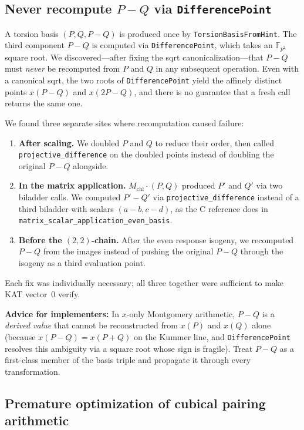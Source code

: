 \subsection{Never recompute \texorpdfstring{$P{-}Q$}{P-Q} via
  \texttt{DifferencePoint}}
\label{sec:bug-pmq-recompute}

A torsion basis $(P, Q, P{-}Q)$ is produced once by
\texttt{TorsionBasisFromHint}.  The third component $P{-}Q$ is
computed via \texttt{DifferencePoint}, which takes an
$\mathbb{F}_{p^2}$ square root.  We discovered---after fixing the
sqrt canonicalization---that $P{-}Q$ must \emph{never} be recomputed
from $P$ and $Q$ in any subsequent operation.  Even with a canonical
sqrt, the two roots of \texttt{DifferencePoint} yield the affinely
distinct points $x(P{-}Q)$ and $x(2P{-}Q)$, and there is no guarantee
that a fresh call returns the same one.

We found three separate sites where recomputation caused failure:
\begin{enumerate}
  \item \textbf{After scaling.} We doubled $P$ and $Q$ to reduce
    their order, then called \texttt{projective\_difference} on the
    doubled points instead of doubling the original $P{-}Q$ alongside.
  \item \textbf{In the matrix application.} $M_{\mathrm{chl}} \cdot
    (P, Q)$ produced $P'$ and $Q'$ via two biladder calls.  We
    computed $P'{-}Q'$ via \texttt{projective\_difference} instead of
    a third biladder with scalars $(a{-}b, c{-}d)$, as the C reference
    does in \texttt{matrix\_scalar\_application\_even\_basis}.
  \item \textbf{Before the $(2,2)$-chain.} After the even response
    isogeny, we recomputed $P{-}Q$ from the images instead of pushing
    the original $P{-}Q$ through the isogeny as a third evaluation
    point.
\end{enumerate}
Each fix was individually necessary; all three together were sufficient
to make KAT vector~0 verify.

\noindent
\textbf{Advice for implementers:} In $x$-only Montgomery arithmetic, $P{-}Q$ is a
\emph{derived value} that cannot be reconstructed from $x(P)$ and
$x(Q)$ alone (because $x(P{-}Q) = x(P{+}Q)$ on the Kummer line, and
\texttt{DifferencePoint} resolves this ambiguity via a square root
whose sign is fragile).  Treat $P{-}Q$ as a first-class member of the
basis triple and propagate it through every transformation.

\subsection{Premature optimization of cubical pairing arithmetic}
\label{sec:bug-cubical-opt}

